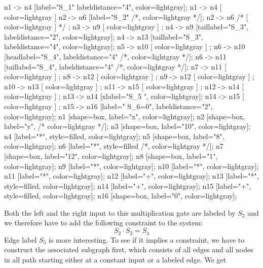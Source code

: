 \begin{example}
\begin{center}
{	n1 -> n4 [label="S_1" labeldistance="4", color=lightgray];
        n1 -> n4 [ color=lightgray ]
	n2 -> n6 [label="S_2" /*, color=lightgray */];
	n2 -> n6 /* [ color=lightgray ] */ ;
	n3 -> n9 [ color=lightgray ] ;
	n4 -> n9 [taillabel="S_3", labeldistance="2", color=lightgray];
	n4 -> n13 [taillabel="S_3", labeldistance="4", color=lightgray];
	n5 -> n10 [ color=lightgray ] ;
	n6 -> n10 [headlabel="S_4", labeldistance="4" /*, color=lightgray */];
	n6 -> n11 [taillabel="S_4", labeldistance="4" /*, color=lightgray */];
	n7 -> n11 [ color=lightgray ] ;
	n8 -> n12 [ color=lightgray ] ;
	n9 -> n12 [ color=lightgray ] ;
	n10 -> n13 [ color=lightgray ] ; 
	n11 -> n15 [ color=lightgray ] ;
	n12 -> n14 [ color=lightgray ] ;	
	n13 -> n14 [xlabel="S_5  ", color=lightgray];
	n14 -> n15 [ color=lightgray ] ;
	n15 -> n16 [label="  S_6=0", labeldistance="2", color=lightgray];
	n1 [shape=box, label="x", color=lightgray];
	n2 [shape=box, label="y", /* color=lightgray */];
	n3 [shape=box, label="10", color=lightgray];
	n4 [label="*", style=filled, color=lightgray];
	n5 [shape=box, label="8", color=lightgray];
	n6 [label="*", style=filled /*, color=lightgray */];
	n7 [shape=box, label="12", color=lightgray];
	n8 [shape=box, label="1", color=lightgray];
	n9 [label="*", color=lightgray];
	n10 [label="*", color=lightgray];
	n11 [label="*", color=lightgray];	
	n12 [label="+", color=lightgray];	
	n13 [label="*", style=filled, color=lightgray];
	n14 [label="+", color=lightgray];
	n15 [label="+", style=filled, color=lightgray];
	n16 [shape=box, label="0", color=lightgray];		
}
\end{center}
Both the left and the right input to this multiplication gate are labeled by $S_2$ and we therefore have to add the following constraint to the system:
$$
S_2 \cdot S_2 = S_4
$$
Edge label $S_5$ is more interesting. To see if it implies a constraint, we have to construct the associated subgraph first, which consists of all edges and all nodes in all path starting either at a constant input or a labeled edge. We get  
\begin{center}
\end{center}
\end{example}
